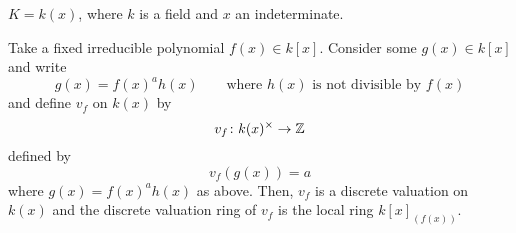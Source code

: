\begin{example}{}{}
	\(K = k(x)\), where \(k\) is a field and \(x\) an indeterminate.

	Take a fixed irreducible polynomial \(f(x) \in k[x]\).
	Consider some \(g(x) \in k[x]\) and write
	\[
		g(x) = f(x)^a h(x) \quad\quad \text{where } h(x) \text{ is not
		divisible by } f(x)
	\]
	and define \(v_f\) on \(k(x)\) by
	\[
		v_f \colon k(x)^{\times} \to \ZZ
	\]
	defined by
	\[
		v_f (g(x)) = a
	\]
	where \(g(x) = f(x)^a h(x)\) as above.
	Then, \(v_f\) is a discrete valuation on \(k(x)\) and the discrete
	valuation ring of \(v_f\) is the local ring \(k[x]_{(f(x))}\).
\end{example}